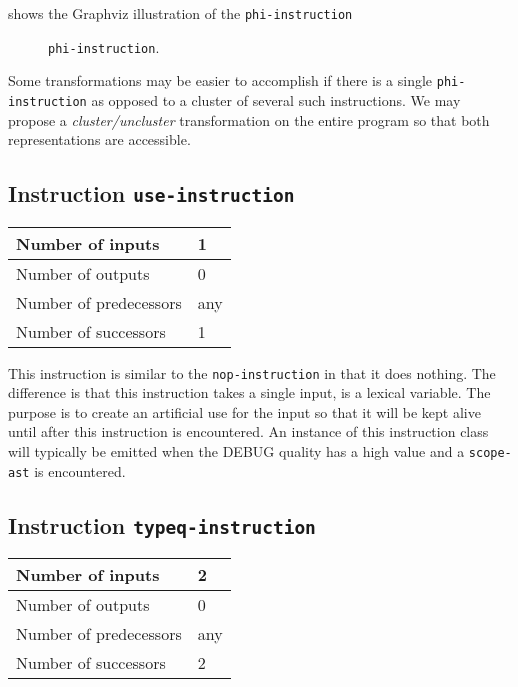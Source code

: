  shows the Graphviz illustration of the
\texttt{phi-instruction}

\begin{figure}
\begin{center}
\end{center}
\caption{\label{fig-phi-instruction}
\texttt{phi-instruction}.}
\end{figure}

Some transformations may be easier to accomplish if there is a single
\texttt{phi-instruction} as opposed to a cluster of several such
instructions.  We may propose a \emph{cluster/uncluster}
transformation on the entire program so that both representations are
accessible. 

\subsection{Instruction \texttt{use-instruction}}
\label{mir-instruction-phi}

\begin{tabular}{|l|l|}
\hline
Number of inputs &  1\\
\hline
Number of outputs & 0\\
\hline
Number of predecessors & any\\
\hline
Number of successors & 1\\
\hline
\end{tabular}

This instruction is similar to the \texttt{nop-instruction} in that it
does nothing.  The difference is that this instruction takes a single
input, is a lexical variable.  The purpose is to create an artificial
use for the input so that it will be kept alive until after this
instruction is encountered.  An instance of this instruction class
will typically be emitted when the DEBUG quality has a high value and
a \texttt{scope-ast} is encountered.

\subsection{Instruction \texttt{typeq-instruction}}
\label{mir-instruction-typeq}

\begin{tabular}{|l|l|}
\hline
Number of inputs & 2\\
\hline
Number of outputs & 0\\
\hline
Number of predecessors & any\\
\hline
Number of successors & 2\\
\hline
\end{tabular}

